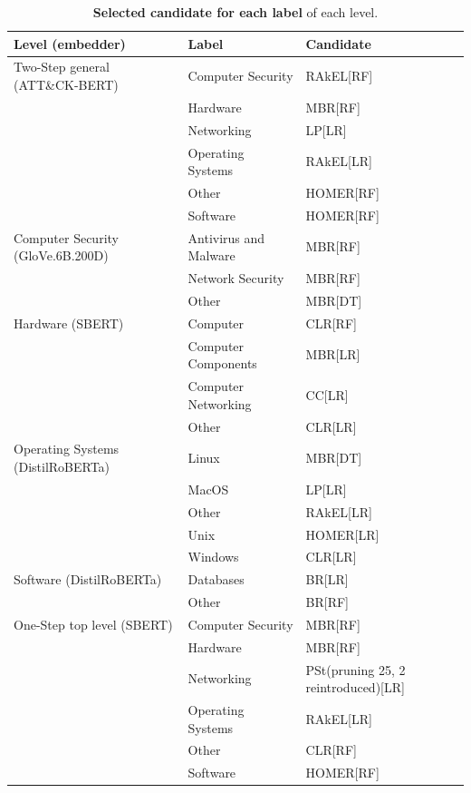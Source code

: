 \documentclass{Configuration_Files/PoliMi3i_thesis}
\begin{document}
\begin{table}
    \centering
    \caption{\textbf{Selected candidate for each label} of each level.}
    \label{tab:selected-candidates}
    \footnotesize
    \begin{tabular}{lll}
        \hline
        \textbf{Level (embedder)} & \textbf{Label} & \textbf{Candidate} \\
        \hline
        Two-Step general (ATT{\&}CK-BERT) & Computer Security & RAkEL[RF] \\
         & Hardware & MBR[RF] \\
         & Networking & LP[LR] \\
         & Operating Systems & RAkEL[LR] \\
         & Other & HOMER[RF] \\
         & Software & HOMER[RF] \\
        \hline
        Computer Security (GloVe.6B.200D) & Antivirus and Malware & MBR[RF] \\
         & Network Security & MBR[RF] \\
         & Other & MBR[DT] \\
        \hline
        Hardware (SBERT) & Computer & CLR[RF] \\
         & Computer Components & MBR[LR] \\
         & Computer Networking & CC[LR] \\
         & Other & CLR[LR] \\
        \hline
        Operating Systems (DistilRoBERTa) & Linux & MBR[DT] \\
         & MacOS & LP[LR] \\
         & Other & RAkEL[LR] \\
         & Unix & HOMER[LR] \\
         & Windows & CLR[LR] \\
        \hline
        Software (DistilRoBERTa) & Databases & BR[LR] \\
         & Other & BR[RF] \\
        \hline
        One-Step top level (SBERT) & Computer Security & MBR[RF] \\
         & Hardware & MBR[RF] \\
         & Networking & PSt(pruning 25, 2 reintroduced)[LR] \\
         & Operating Systems & RAkEL[LR] \\
         & Other & CLR[RF] \\
         & Software & HOMER[RF] \\
        \hline
    \end{tabular}
\end{table}
\end{document}
